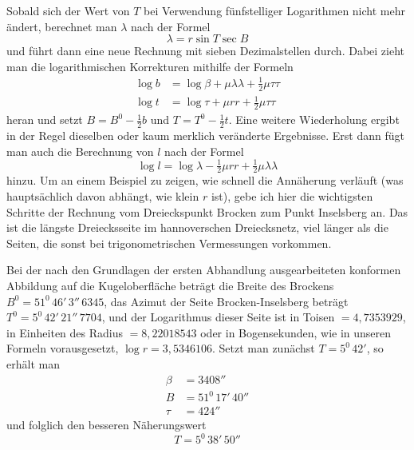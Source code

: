 %
Sobald sich der Wert von \(T\) bei Verwendung fünfstelliger Logarithmen nicht mehr ändert, berechnet man \(\lambda\) nach der Formel
\[
\lambda=r\sin T\sec B
\]
und führt dann eine neue Rechnung mit sieben Dezimalstellen durch. Dabei zieht man die logarithmischen Korrekturen mithilfe der Formeln
\[
\begin{aligned}
\log b&=\log\beta+\mu\lambda\lambda+\tfrac12\mu\tau\tau\\
\log t&=\log\tau+\mu rr+\tfrac12\mu\tau\tau
\end{aligned}
\]
heran und setzt \(B=B^0-\frac12b\) und \(T=T^0-\frac12t\). Eine weitere Wiederholung ergibt in der Regel dieselben oder kaum merklich veränderte Ergebnisse. Erst dann fügt man auch die Berechnung von \(l\) nach der Formel
\[
\log l=\log\lambda-\tfrac12\mu rr+\tfrac12\mu\lambda\lambda
\]
hinzu. Um an einem Beispiel zu zeigen, wie schnell die Annäherung verläuft (was hauptsächlich davon abhängt, wie klein \(r\) ist), gebe ich hier die wichtigsten Schritte der Rechnung vom Dreieckspunkt Brocken zum Punkt Inselsberg an. Das ist die längste Dreiecksseite im hannoverschen Dreiecksnetz, viel länger als die Seiten, die sonst bei trigonometrischen Vermessungen vorkommen.

Bei der nach den Grundlagen der ersten Abhandlung ausgearbeiteten konformen Abbildung auf die Kugeloberfläche beträgt die Breite des Brockens \(B^0=51^0\,46'\,3''\,6345\), das Azimut der Seite Brocken-Inselsberg beträgt \(T^0=5^0\,42'\,21''\,7704\), und der Logarithmus dieser Seite ist in Toisen \(=4{,}7353929\), in Einheiten des Radius \(=8{,}22018543\) oder in Bogensekunden, wie in unseren Formeln vorausgesetzt, \(\log r=3{,}5346106\). Setzt man zunächst \(T=5^0\,42'\), so erhält man
\[
\begin{aligned}
\beta&=3408''\\
B&=51^0\,17'\,40''\\
\tau&=424''
\end{aligned}
\]
und folglich den besseren Näherungswert
\[
T=5^0\,38'\,50''
\]
